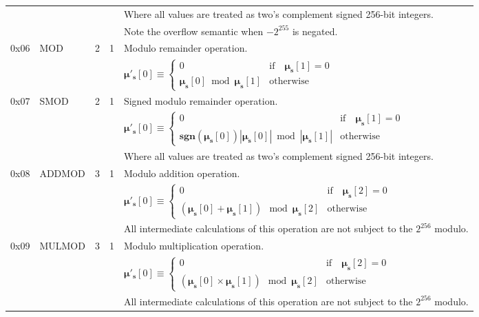 \documentclass[9pt,oneside]{amsart}
\begin{document}
\begin{tabular*}{\columnwidth}[h]{rlrrl}
&&&& Where all values are treated as two's complement signed 256-bit integers. \\
&&&& Note the overflow semantic when $-2^{255}$ is negated.\\
\midrule
0x06 & {\small MOD} & 2 & 1 & Modulo remainder operation. \\
&&&& $\boldsymbol{\mu}'_\mathbf{s}[0] \equiv \begin{cases}0 & \text{if} \quad \boldsymbol{\mu}_\mathbf{s}[1] = 0\\ \boldsymbol{\mu}_\mathbf{s}[0] \bmod \boldsymbol{\mu}_\mathbf{s}[1] & \text{otherwise}\end{cases}$  \\
\midrule
0x07 & {\small SMOD} & 2 & 1 & Signed modulo remainder operation. \\
&&&& $\boldsymbol{\mu}'_\mathbf{s}[0] \equiv \begin{cases}0 & \text{if} \quad \boldsymbol{\mu}_\mathbf{s}[1] = 0\\ \mathbf{sgn} (\boldsymbol{\mu}_\mathbf{s}[0]) |\boldsymbol{\mu}_\mathbf{s}[0]| \bmod |\boldsymbol{\mu}_\mathbf{s}[1]| & \text{otherwise}\end{cases}$  \\
&&&& Where all values are treated as two's complement signed 256-bit integers. \\
\midrule
0x08 & {\small ADDMOD} & 3 & 1 & Modulo addition operation. \\
&&&& $\boldsymbol{\mu}'_\mathbf{s}[0] \equiv \begin{cases}0 & \text{if} \quad \boldsymbol{\mu}_\mathbf{s}[2] = 0\\ (\boldsymbol{\mu}_\mathbf{s}[0] + \boldsymbol{\mu}_\mathbf{s}[1]) \mod \boldsymbol{\mu}_\mathbf{s}[2] & \text{otherwise}\end{cases}$  \\
&&&& All intermediate calculations of this operation are not subject to the $2^{256}$ modulo. \\
\midrule
0x09 & {\small MULMOD} & 3 & 1 & Modulo multiplication operation. \\
&&&& $\boldsymbol{\mu}'_\mathbf{s}[0] \equiv \begin{cases}0 & \text{if} \quad \boldsymbol{\mu}_\mathbf{s}[2] = 0\\ (\boldsymbol{\mu}_\mathbf{s}[0] \times \boldsymbol{\mu}_\mathbf{s}[1]) \mod \boldsymbol{\mu}_\mathbf{s}[2] & \text{otherwise}\end{cases}$  \\
&&&& All intermediate calculations of this operation are not subject to the $2^{256}$ modulo. \\

\end{tabular*}
\end{document}
